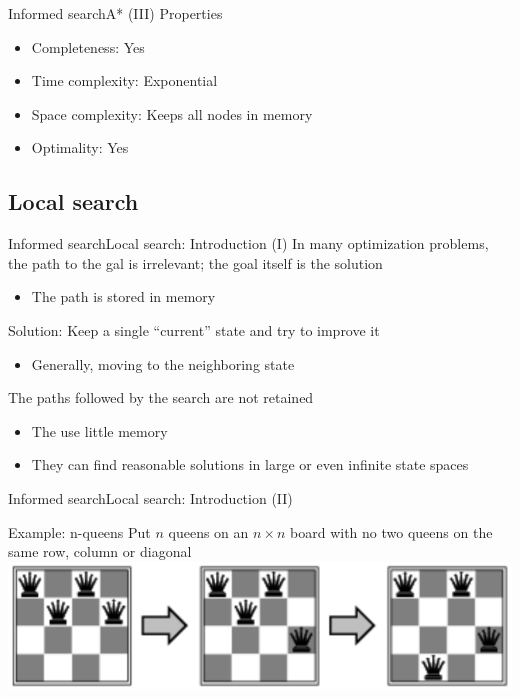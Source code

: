 \documentclass[10pt,compress]{beamer} %
\begin{document}
\begin{frame}{Informed search}{A* (III)}
      Properties
      \begin{itemize}
        \item Completeness: Yes
        \item Time complexity: Exponential
        \item Space complexity: Keeps all nodes in memory
        \item Optimality: Yes
      \end{itemize}
\end{frame}

\subsection{Local search}

\begin{frame}{Informed search}{Local search: Introduction (I)}
    In many optimization problems, the path to the gal is irrelevant; the goal itself is the solution
      \begin{itemize}
        \item The path is stored in memory
      \end{itemize}
    Solution: Keep a single ``current'' state and try to improve it
      \begin{itemize}
        \item Generally, moving to the neighboring state
      \end{itemize}
    The paths followed by the search are not retained
    \begin{itemize}
      \item The use little memory
      \item They can find reasonable solutions in large or even infinite state spaces
    \end{itemize}
\end{frame}

\begin{frame}[fragile]{Informed search}{Local search: Introduction (II)}
    \begin{exampleblock}{Example: n-queens}
        Put $n$ queens on an $n \times n$ board with no two queens on the  same row, column or diagonal\\
    \includegraphics[width=\linewidth]{figs/8queens-local.png}
    \end{exampleblock}
\end{frame}
\end{document}
